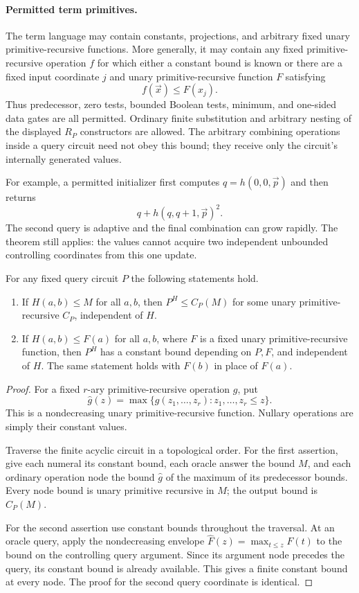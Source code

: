 \paragraph{Permitted term primitives.}
The term language may contain constants, projections, and arbitrary fixed
unary primitive-recursive functions. More generally, it may contain any
fixed primitive-recursive operation $f$ for which either a constant bound
is known or there are a fixed input coordinate $j$ and unary
primitive-recursive function $F$ satisfying
\[
                    f(\vec x)\le F(x_j).
 \tag{One-coordinate bound}
\]
Thus predecessor, zero tests, bounded Boolean tests, minimum, and
one-sided data gates are all permitted. Ordinary finite substitution
and arbitrary nesting of the displayed $R_P$ constructors are allowed.
The arbitrary combining operations inside a query circuit need not obey
this bound; they receive only the circuit's internally generated values.

For example, a permitted initializer first computes
$q=h(0,0,\vec p)$ and then returns
\[
                  q+h(q,q+1,\vec p)^2.
\]
The second query is adaptive and the final combination can grow rapidly.
The theorem still applies: the values cannot acquire two independent
unbounded controlling coordinates from this one update.

\begin{lemma}
For any fixed query circuit $P$ the following statements hold.
\begin{enumerate}
\item If $H(a,b)\le M$ for all $a,b$, then
      $P^H\le C_P(M)$ for some unary primitive-recursive $C_P$,
      independent of $H$.
\item If $H(a,b)\le F(a)$ for all $a,b$, where $F$ is a fixed unary
      primitive-recursive function, then $P^H$ has a constant bound
      depending on $P,F$, and independent of $H$. The same statement
      holds with $F(b)$ in place of $F(a)$.
\end{enumerate}
\end{lemma}
\begin{proof}
For a fixed $r$-ary primitive-recursive operation $g$, put
\[
 \widehat g(z)=\max\{g(z_1,\ldots,z_r):z_1,\ldots,z_r\le z\}.
\]
This is a nondecreasing unary primitive-recursive function. Nullary
operations are simply their constant values.

Traverse the finite acyclic circuit in a topological order. For the
first assertion, give each numeral its constant bound, each oracle
answer the bound $M$, and each ordinary operation node the bound
$\widehat g$ of the maximum of its predecessor bounds. Every node bound
is unary primitive recursive in $M$; the output bound is $C_P(M)$.

For the second assertion use constant bounds throughout the traversal.
At an oracle query, apply the nondecreasing envelope
$\widehat F(z)=\max_{t\le z}F(t)$ to the bound on the controlling query
argument. Since its argument node precedes the query, its constant bound
is already available. This gives a finite constant bound at every node.
The proof for the second query coordinate is identical.
\end{proof}

